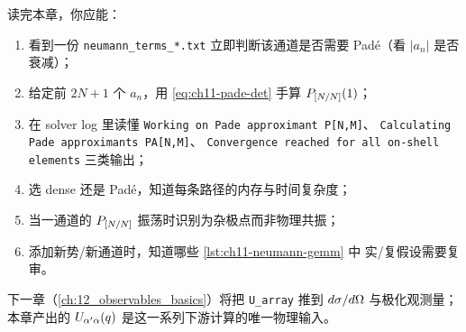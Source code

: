 读完本章，你应能：
\begin{enumerate}
  \item 看到一份 \texttt{neumann\_terms\_*.txt} 立即判断该通道是否需要 Padé（看 \(|a_n|\) 是否衰减）；
  \item 给定前 \(2N+1\) 个 \(a_n\)，用 \cref{eq:ch11-pade-det} 手算 \(P_{[N/N]}(1)\)；
  \item 在 solver log 里读懂 \texttt{Working on Pade approximant P[N,M]}、
        \texttt{Calculating Pade approximants PA[N,M]}、
        \texttt{Convergence reached for all on-shell elements} 三类输出；
  \item 选 dense 还是 Padé，知道每条路径的内存与时间复杂度；
  \item 当一通道的 \(P_{[N/N]}\) 振荡时识别为杂极点而非物理共振；
  \item 添加新势/新通道时，知道哪些 \cref{lst:ch11-neumann-gemm} 中
        实/复假设需要复审。
\end{enumerate}

下一章（\cref{ch:12_observables_basics}）将把 \texttt{U\_array} 推到
\(d\sigma/d\Omega\) 与极化观测量；本章产出的 \(U_{\alpha'\alpha}(q)\)
是这一系列下游计算的唯一物理输入。
